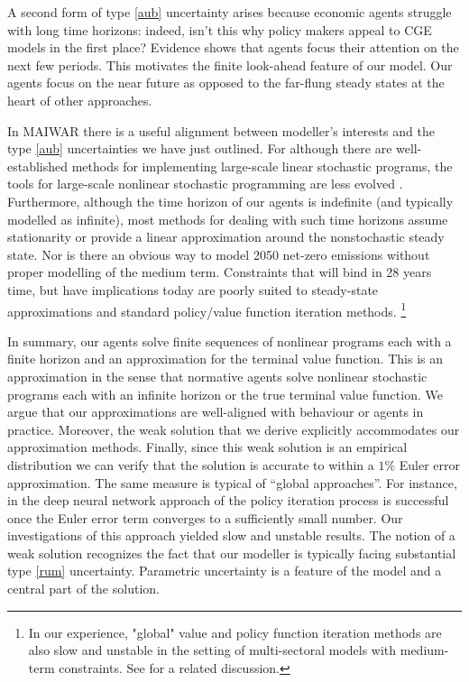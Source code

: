 \documentclass[12pt,a4paper,twoside, draft]{article}
\begin{document}
A second form of type \ref{aub} uncertainty arises because economic agents
struggle with long time horizons: indeed, isn't this why policy makers appeal 
to CGE models in the first place?
Evidence shows that agents focus their attention on the next few periods.
This motivates the finite look-ahead feature of our model.
Our agents focus on the near future as opposed to the far-flung steady states
at the heart of other approaches.

In MAIWAR there is a useful alignment between modeller's interests and the type
\ref{aub} uncertainties we have just outlined.
For although there are well-established methods for implementing large-scale
linear stochastic programs, the tools for large-scale nonlinear stochastic
programming are less evolved \citet{Rehfeldt-PETSc}.
Furthermore, although the time horizon of our agents is indefinite (and
typically modelled as infinite), most methods for dealing with such time
horizons assume stationarity or provide a linear approximation around the
nonstochastic steady state.
Nor is there an obvious way to model 2050 net-zero emissions without proper
modelling of the medium term.
Constraints that will bind in 28 years time, but have implications today are
poorly suited to steady-state approximations and standard policy/value
function iteration methods.
\footnote{
   In our experience, "global" value and policy function iteration methods
   are also slow and unstable in the setting of multi-sectoral models with
   medium-term constraints.
   See \citet{CJ} for a related discussion.
}

In summary, our agents solve finite sequences of nonlinear programs each with a
finite horizon and an approximation for the terminal value function. 
This is an approximation in the sense that normative agents solve nonlinear
stochastic programs each with an infinite horizon or the true terminal value
function.
We argue that our approximations are well-aligned with behaviour or agents in
practice.
Moreover, the weak solution that we derive explicitly accommodates our
approximation methods.
Finally, since this weak solution is an empirical distribution we can verify 
that the solution is accurate to within a $1\%$ Euler error approximation. 
The same measure is typical of ``global approaches''.
For instance, in the deep neural network approach of
\citet{Scheidegger_et_al-DEQN} the policy iteration process is successful once
the Euler error term converges to a sufficiently small number.
Our investigations of this approach yielded slow and unstable results.
The notion of a weak solution recognizes the fact that our modeller is
typically facing substantial type \ref{rum} uncertainty.
Parametric uncertainty is a feature of the model and a central part of the
solution.
\end{document}
